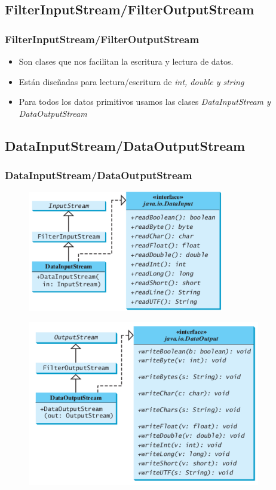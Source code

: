 \documentclass{beamer}
\begin{document}
\subsection{FilterInputStream/FilterOutputStream}

\begin{frame}
\frametitle{FilterInputStream/FilterOutputStream}
\begin{itemize}[<+->]
\item Son clases que nos facilitan la escritura y lectura de datos.
\item Están diseñadas para lectura/escritura de \emph{int, double y string}
\item Para todos los datos primitivos usamos las clases \emph{DataInputStream y DataOutputStream}
\end{itemize}
\end{frame}



\subsection{DataInputStream/DataOutputStream}
\begin{frame}
\frametitle{DataInputStream/DataOutputStream}
\begin{multicols}{2} 
\begin{figure}
\includegraphics[scale=0.6]{imagenes/di.png} 
\end{figure} 
\begin{figure}
\includegraphics[scale=0.5]{imagenes/do.png} 
\end{figure}
\end{multicols}
\end{frame}
\end{document}
